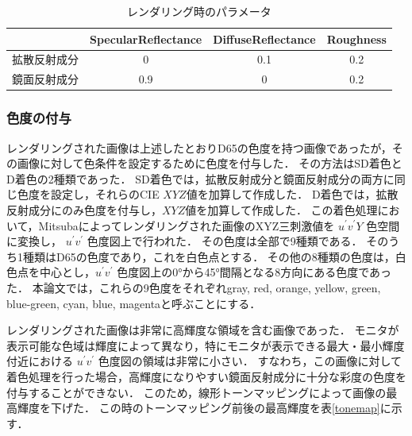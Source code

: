                 \begin{table}[h]
                    \centering
                    \caption{レンダリング時のパラメータ}
                    \begin{tabular}{|l||c|c|c|} \hline
                                            & SpecularReflectance & DiffuseReflectance & Roughness \\ \hline \hline
                        拡散反射成分           & 0                   & 0.1                & 0.2 \\ \hline
                        鏡面反射成分           & 0.9                 & 0                  & 0.2 \\ \hline
                    \end{tabular}
                    \label{render_param}
                \end{table}
            
            \subsubsection{色度の付与}

                レンダリングされた画像は上述したとおりD65の色度を持つ画像であったが，その画像に対して色条件を設定するために色度を付与した．
                その方法はSD着色とD着色の2種類であった．
                SD着色では，拡散反射成分と鏡面反射成分の両方に同じ色度を設定し，それらのCIE $XYZ$値を加算して作成した．
                D着色では，拡散反射成分にのみ色度を付与し，$XYZ$値を加算して作成した．
                この着色処理において，Mitsubaによってレンダリングされた画像のXYZ三刺激値を $u^{\prime}v^{\prime}Y$ 色空間に変換し， $u^{\prime}v^{\prime}$ 色度図上で行われた．
                その色度は全部で9種類である．
                そのうち1種類はD65の色度であり，これを白色点とする．
                その他の8種類の色度は，白色点を中心とし，$u^{\prime}v^{\prime}$ 色度図上の0°から45°間隔となる8方向にある色度であった．
                本論文では，これらの9色度をそれぞれgray, red, orange, yellow, green, blue-green, cyan, blue, magentaと呼ぶことにする．

                レンダリングされた画像は非常に高輝度な領域を含む画像であった．
                モニタが表示可能な色域は輝度によって異なり，特にモニタが表示できる最大・最小輝度付近における $u^{\prime}v^{\prime}$ 色度図の領域は非常に小さい．
                すなわち，この画像に対して着色処理を行った場合，高輝度になりやすい鏡面反射成分に十分な彩度の色度を付与することができない．
                このため，線形トーンマッピングによって画像の最高輝度を下げた．
                この時のトーンマッピング前後の最高輝度を表\ref{tonemap}に示す．

